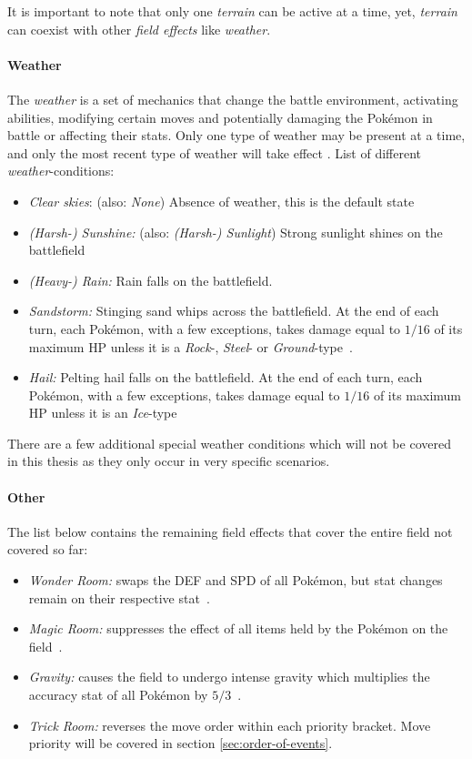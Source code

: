 It is important to note that only one \textit{terrain} can be active at a time, yet, \textit{terrain}
can coexist with other \textit{field effects} like \textit{weather}.

\paragraph{Weather}
The \textit{weather} is a set of mechanics that change the battle environment, activating abilities, modifying
certain moves and potentially damaging the Pokémon in battle or affecting their stats. Only one type of weather may 
be present at a time, and only the most recent type of weather will take effect \cite{Bulbapedia:Weather}. List
of different \textit{weather}-conditions:
\begin{itemize}
	\item \textit{Clear skies}: (also: \emph{None}) Absence of weather, this is the default state
	\item \textit{(Harsh-) Sunshine:} (also: \emph{(Harsh-) Sunlight}) Strong sunlight shines on the 
	battlefield
	\item \textit{(Heavy-) Rain:} Rain falls on the battlefield.
	\item \textit{Sandstorm:} Stinging sand whips across the battlefield. At the end of each turn, each
	Pokémon, with a few exceptions, takes damage equal to $1/16$ of its maximum \ac{HP} unless it is 
	a \textit{Rock}-, \textit{Steel}- or
	\textit{Ground}-type~\autocite{Bulbapedia:SandstormWeather}.
	\item \textit{Hail:} Pelting hail falls on the battlefield. At the end of each turn, each
	Pokémon, with a few exceptions, takes damage equal to $1/16$ of its maximum \ac{HP} unless it is an 
	\textit{Ice}-type~\autocite{Bulbapedia:HailWeather}
\end{itemize}
There are a few additional special weather conditions which will not be covered in this thesis as they only occur in 
very specific scenarios.

\paragraph{Other}
The list below contains the remaining field effects that cover the entire field not covered so far:
\begin{itemize}
	\item \textit{Wonder Room:} swaps the \ac{DEF} and \ac{SPD} of all Pokémon, but stat changes
	remain on their respective stat~\autocite{Bulbapedia:WonderRoom}. 
	\item \textit{Magic Room:} suppresses the effect of all items held by the Pokémon on the field~\autocite{Bulbapedia:MagicRoom}.
	\item \textit{Gravity:} causes the field to undergo intense gravity which multiplies the accuracy stat of
	all Pokémon by $5/3$~\autocite{Bulbapedia:Gravity}.
	\item \textit{Trick Room:} reverses the move order within each priority bracket. Move priority will be covered
	in section \ref{sec:order-of-events}.
\end{itemize}

